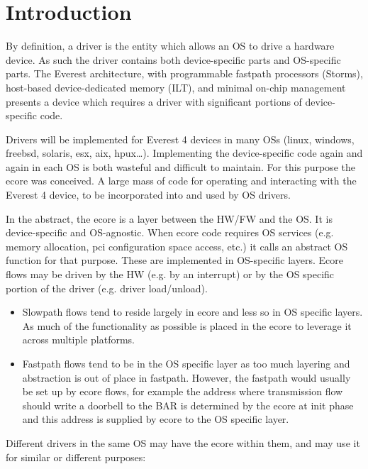 \documentclass[11pt,fleqn,hidelinks,oneside]{book} %
\begin{document}
\chapter{Introduction}
By definition, a driver is the entity which allows an OS to drive a hardware device.
As such the driver contains both device-specific parts and OS-specific parts.
The Everest architecture, with programmable fastpath processors (Storms), host-based device-dedicated memory (ILT), and minimal on-chip management presents a device which requires a driver with significant portions of device-specific code.

Drivers will be implemented for Everest 4 devices in many OSs (linux, windows, freebsd, solaris, esx, aix, hpux…).
Implementing the device-specific code again and again in each OS is both wasteful and difficult to maintain.
For this purpose the ecore was conceived.
A large mass of code for operating and interacting with the Everest 4 device, to be incorporated into and used by OS drivers.

In the abstract, the ecore is a layer between the HW/FW and the OS.
It is device-specific and OS-agnostic. When ecore code requires OS services (e.g. memory allocation, pci configuration space access, etc.) it calls an abstract OS function for that purpose. These are implemented in OS-specific layers.
Ecore flows may be driven by the HW (e.g. by an interrupt) or by the OS specific portion of the driver (e.g. driver load/unload).

\begin{itemize}

	\item Slowpath flows tend to reside largely in ecore and less so in OS specific layers. As much of the functionality as possible is placed in the ecore to leverage it across multiple platforms. \\

	\item Fastpath flows tend to be in the OS specific layer as too much layering and abstraction is out of place in fastpath.
However, the fastpath would usually be set up by ecore flows, for example the address where transmission flow should write a doorbell to the BAR is determined by the ecore at init phase and this address is supplied by ecore to the OS specific layer. \\

\end{itemize}

Different drivers in the same OS may have the ecore within them, and may use it for similar or different purposes:
\end{document}
